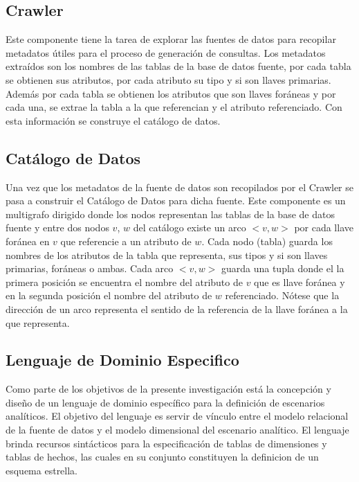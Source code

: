 \subsection{Crawler}

Este componente tiene la tarea de explorar las fuentes de datos para recopilar metadatos \'utiles para el proceso de generaci\'on
de consultas. Los metadatos extra\'idos son los nombres de las tablas de la base de datos fuente, por cada tabla se obtienen sus 
atributos, por cada atributo su tipo y si son llaves primarias. Adem\'as por cada tabla se obtienen los atributos que son llaves 
for\'aneas y por cada una, se extrae la tabla a la que referencian y el atributo referenciado. Con esta información se construye 
el catálogo de datos.

\subsection{Catálogo de Datos}

Una vez que los metadatos de la fuente de datos son recopilados por el Crawler se pasa a construir el Catálogo de Datos para dicha fuente. 
Este componente 
es un multigrafo dirigido donde los nodos representan las tablas de la base de datos fuente y entre dos nodos $v$, $w$ 
del catálogo existe un arco $<v,w>$ por cada llave for\'anea en $v$ que referencie a un atributo de $w$. Cada nodo (tabla) guarda 
los nombres de los atributos de la tabla que representa, sus tipos y si son llaves primarias, for\'aneas o ambas. Cada arco $<v,w>$ 
guarda una tupla donde el la primera posici\'on se encuentra el nombre del atributo de $v$ que es llave for\'anea y en la segunda 
posici\'on el nombre del atributo de $w$ referenciado. N\'otese que la direcci\'on de un arco representa el sentido de la 
referencia de la llave for\'anea a la que representa.

\subsection{Lenguaje de Dominio Especifico}

Como parte de los objetivos de la presente investigaci\'on est\'a la concepción y diseño de un lenguaje de dominio 
espec\'ifico para la definici\'on de escenarios analíticos. El objetivo del lenguaje es servir de v\'inculo 
entre el modelo relacional de la fuente de datos y el modelo dimensional del escenario analítico. El lenguaje 
brinda recursos sintácticos para la especificaci\'on de tablas de dimensiones y tablas de hechos, las cuales 
en su conjunto constituyen la definicion de un esquema estrella.

